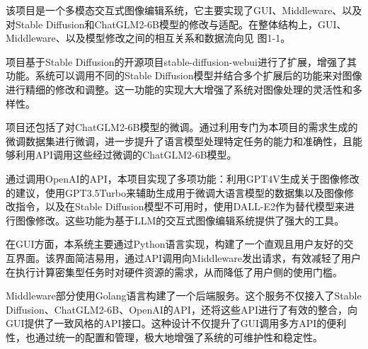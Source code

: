 \documentclass[a4paper,AutoFakeBold,oneside,12pt]{book}
\begin{document}






该项目是一个多模态交互式图像编辑系统，它主要实现了GUI、Middleware、以及对Stable Diffusion和ChatGLM2-6B模型的修改与适配。在整体结构上，GUI、Middleware、以及模型修改之间的相互关系和数据流向见 图1-1。

项目基于Stable Diffusion的开源项目stable-diffusion-webui进行了扩展，增强了其功能。系统可以调用不同的Stable Diffusion模型并结合多个扩展后的功能来对图像进行精细的修改和调整。这一功能的实现大大增强了系统对图像处理的灵活性和多样性。

项目还包括了对ChatGLM2-6B模型的微调。通过利用专门为本项目的需求生成的微调数据集进行微调，进一步提升了语言模型处理特定任务的能力和准确性，且能够利用API调用这些经过微调的ChatGLM2-6B模型。

通过调用OpenAI的API，本项目实现了多项功能：利用GPT4V生成关于图像修改的建议，使用GPT3.5Turbo来辅助生成用于微调大语言模型的数据集以及图像修改指令，以及在Stable Diffusion模型不可用时，使用DALL-E2作为替代模型来进行图像修改。这些功能为基于LLM的交互式图像编辑系统提供了强大的工具。

在GUI方面，本系统主要通过Python语言实现，构建了一个直观且用户友好的交互界面。该界面简洁易用，通过API调用向Middleware发出请求，有效减轻了用户在执行计算密集型任务时对硬件资源的需求，从而降低了用户侧的使用门槛。

Middleware部分使用Golang语言构建了一个后端服务。这个服务不仅接入了Stable Diffusion、ChatGLM2-6B、OpenAI的API，还将这些API进行了有效的整合，向GUI提供了一致风格的API接口。这种设计不仅提升了GUI调用多方API的便利性，也通过统一的配置和管理，极大地增强了系统的可维护性和稳定性。
\end{document}

